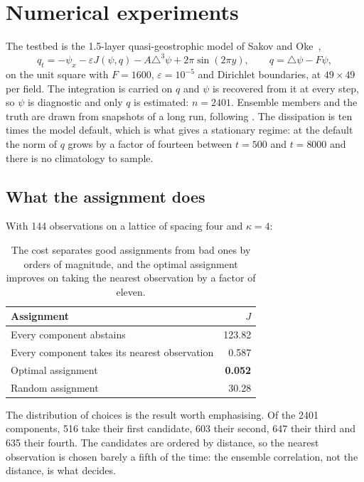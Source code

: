 \documentclass[11pt,a4paper]{article}
\begin{document}
\section{Numerical experiments}

The testbed is the 1.5-layer quasi-geostrophic model of Sakov and
Oke~\cite{sakov2008},
%
\begin{equation}
  q_t = -\psi_x - \varepsilon J(\psi,q) - A\triangle^{3}\psi + 2\pi\sin(2\pi y),
  \qquad q = \triangle\psi - F\psi,
\end{equation}
%
on the unit square with $F = 1600$, $\varepsilon = 10^{-5}$ and Dirichlet
boundaries, at $49 \times 49$ per field. The integration is carried on $q$ and
$\psi$ is recovered from it at every step, so $\psi$ is diagnostic and only $q$
is estimated: $n = 2401$. Ensemble members and the truth are drawn from
snapshots of a long run, following \cite{sakov2008}. The dissipation is ten
times the model default, which is what gives a stationary regime: at the
default the norm of $q$ grows by a factor of fourteen between $t=500$ and
$t=8000$ and there is no climatology to sample.

\subsection{What the assignment does}

With 144 observations on a lattice of spacing four and $\kappa = 4$:

\begin{table}[h]
\centering
\begin{tabular}{@{}lr@{}}
\toprule
Assignment & $J$ \\
\midrule
Every component abstains & 123.82 \\
Every component takes its nearest observation & 0.587 \\
Optimal assignment & \textbf{0.052} \\
Random assignment & 30.28 \\
\bottomrule
\end{tabular}
\caption{The cost separates good assignments from bad ones by orders of
magnitude, and the optimal assignment improves on taking the nearest
observation by a factor of eleven.}
\end{table}

The distribution of choices is the result worth emphasising. Of the 2401
components, 516 take their first candidate, 603 their second, 647 their third
and 635 their fourth. The candidates are ordered by distance, so the nearest
observation is chosen barely a fifth of the time: the ensemble correlation, not
the distance, is what decides.
\end{document}
